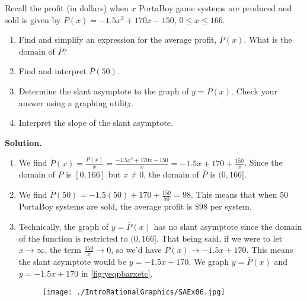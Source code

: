 \begin{ex} \label{PortaBoyAverageProfit}  Recall the profit (in dollars) when $x$ PortaBoy game systems are produced and sold is given by $P(x) =  -1.5x^2+170x-150$, $0 \leq x \leq 166$.

\begin{enumerate}

\item  Find and simplify an expression for the average profit, $\overline{P}(x)$.  What is the domain of $\overline{P}$?

\item Find and interpret $\overline{P}(50)$.

\item Determine the slant asymptote to the graph of $y = \overline{P}(x)$.  Check your answer using a graphing utility.

\item  Interpret the slope of the slant asymptote.


\end{enumerate}

{\bf Solution.}

\begin{enumerate}

\item  We find $\overline{P}(x)  = \frac{P(x)}{x} = \frac{ -1.5x^2+170x-150}{x} = -1.5x + 170 + \frac{150}{x}$.  Since the domain of $P$ is $[0, 166]$ but $x \neq 0$, the domain of $\overline{P}$ is $(0, 166]$.

\item  We find $\overline{P}(50) = -1.5(50)+170 + \frac{150}{50} = 98$.  This means that when $50$ PortaBoy systems are sold, the average profit is $\$ 98$ per system.

\item  Technically, the graph of $y = \overline{P}(x)$ has no slant asymptote since the domain of the function is restricted to $(0, 166]$.  That being said, if we were to let $x \rightarrow \infty$, the term $\frac{150}{x} \rightarrow 0$, so we'd  have $\overline{P}(x)  \rightarrow -1.5x + 170$.  This means the slant asymptote would be $y = -1.5x + 170$.  We graph $y = \overline{P}(x)$ and $y = -1.5x+170$ in \autoref{fig:yeqpbarxetc}.

\begin{figure}
\begin{center}
   
\texttt{[image: ./IntroRationalGraphics/SAEx06.jpg]}


\end{center}
\end{figure}
\end{enumerate}
\end{ex}
